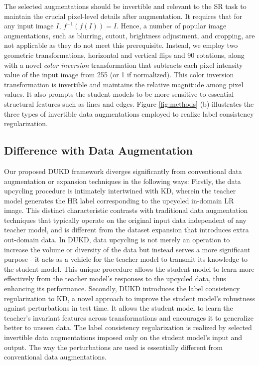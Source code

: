 \documentclass[10pt,twocolumn,letterpaper]{article}
\begin{document}
The selected augmentations should be invertible and relevant to the SR task to maintain the crucial pixel-level details after augmentation. It requires that for any input image $I$, $f^{-1}(f(I))=I$.
Hence, a number of popular image augmentations, such as blurring, cutout, brightness adjustment, and cropping, are not applicable as they do not meet this prerequisite.
Instead, we employ two geometric transformations, horizontal and vertical flips and 90{\textdegree} rotations, along with a novel \textit{color inversion} transformation 
that subtracts each pixel intensity value of the input image from 255 (or 1 if normalized).
This color inversion transformation is invertible and maintains the relative magnitude among pixel values. It also prompts the student models to be more sensitive to essential structural features such as lines and edges.
Figure \ref{fig:methods} (b) illustrates the three types of invertible data augmentations employed to realize label consistency regularization.

\subsection{Difference with Data Augmentation}
Our proposed DUKD framework diverges significantly from conventional data augmentation or expansion techniques in the following ways:
Firstly, the data upcycling procedure is intimately intertwined with KD, wherein the teacher model generates the HR label corresponding to the upcycled in-domain LR image. This distinct characteristic contrasts with traditional data augmentation techniques that typically operate on the original input data independent of any teacher model, and is different from the dataset expansion that introduces extra out-domain data. In DUKD, data upcycling is not merely an operation to increase the volume or diversity of the data but instead serves a more significant purpose - it acts as a vehicle for the teacher model to transmit its knowledge to the student model. This unique procedure allows the student model to learn more effectively from the teacher model's responses to the upcycled data, thus enhancing its performance.
Secondly, DUKD introduces the label consistency regularization to KD, a novel approach to improve the student model's robustness against perturbations in test time. 
It allows the student model to learn the teacher's invariant features across transformations and encourages it to generalize better to unseen data. The label consistency regularization is realized by selected invertible data augmentations imposed only on the student model's input and output. The way the perturbations are used is essentially different from conventional data augmentations.
\end{document}
